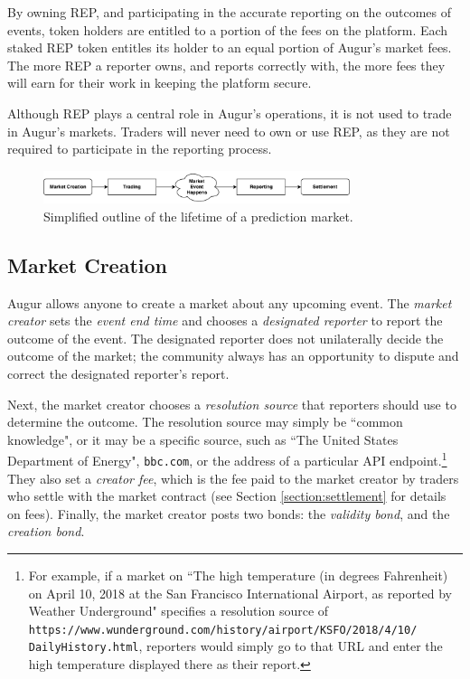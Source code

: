 \documentclass[floatfix,reprint,nofootinbib,amsmath,amssymb,epsfig,pre,floats,letterpaper,groupedaffiliation]{revtex4-1}
\theoremstyle{definition}
\theoremstyle{definition}
\begin{document}
By owning REP, and participating in the accurate reporting on the outcomes of events, token holders are entitled to a portion of the fees on the platform.  Each staked REP token entitles its holder to an equal portion of Augur's market fees.  The more REP a reporter owns, and reports correctly with, the more fees they will earn for their work in keeping the platform secure.

Although REP plays a central role in Augur's operations, it is not used to trade in Augur's markets. Traders will never need to own or use REP, as they are not required to participate in the reporting process.

\begin{figure}
\includegraphics[width=0.8\textwidth]{overview.pdf}
\caption{Simplified outline of the lifetime of a prediction market.}
\label{fig:overview}
\end{figure}

\subsection{Market Creation}

Augur allows anyone to create a market about any upcoming event. The \textit{market creator} sets the \textit{event end time} and chooses a \textit{designated reporter} to report the outcome of the event.  The designated reporter does not unilaterally decide the outcome of the market; the community always has an opportunity to dispute and correct the designated reporter's report.

Next, the market creator chooses a \textit{resolution source} that reporters should use to determine the outcome.  The resolution source may simply be ``common knowledge", or it may be a specific source, such as ``The United States Department of Energy", \texttt{bbc.com}, or the address of a particular API endpoint.\footnote{For example, if a market on ``The high temperature (in degrees Fahrenheit) on April 10, 2018 at the San Francisco International Airport, as reported by Weather Underground" specifies a resolution source of \texttt{https://www.wunderground.com/history/airport/KSFO/2018/4/10/ DailyHistory.html}, reporters would simply go to that URL and enter the high temperature displayed there as their report.}  They also set a \textit{creator fee}, which is the fee paid to the market creator by traders who settle with the market contract (see Section \ref{section:settlement} for details on fees).  Finally, the market creator posts two bonds: the \textit{validity bond}, and the \textit{creation bond}.
\end{document}
